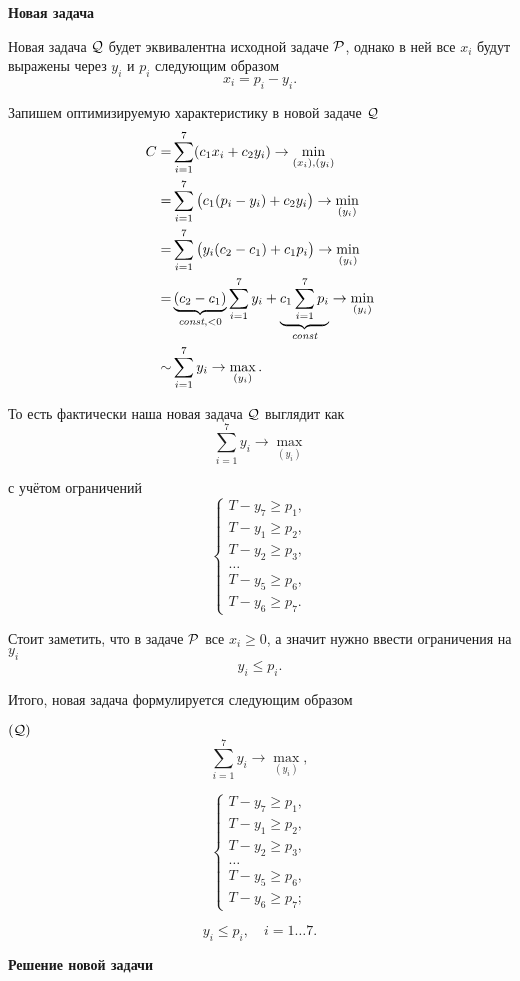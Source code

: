\bigskip

\textbf{Новая задача}

Новая задача $\Q$ будет эквивалентна исходной задаче $\P$, однако в ней все $x_i$ будут выражены через $y_i$ и $p_i$ следующим образом
\[
x_i = p_i - y_i.
\]

Запишем оптимизируемую характеристику в новой задаче $\Q$
\begin{align*}
	C =& \sum_{i=1}^7 (c_1 x_i + c_2 y_i) \to \min_{(x_i), (y_i)} \\
	=& \sum_{i=1}^7 \big(c_1 (p_i - y_i) + c_2 y_i\big) \to \min_{(y_i)} \\
	=&  \sum_{i=1}^7 \big(y_i (c_2 - c_1) + c_1 p_i\big) \to \min_{(y_i)} \\
	=& \underbrace{(c_2 - c_1)}_{\const, <0} \sum_{i=1}^7 y_i + \underbrace{c_1 \sum_{i=1}^{7} p_i}_{\const} \to \min_{(y_i)} \\
	\sim& \sum_{i=1}^7 y_i \to \max_{(y_i)}.
\end{align*}

То есть фактически наша новая задача $\Q$ выглядит как
\[
\sum_{i=1}^7 y_i \to \max_{(y_i)}
\]

с учётом ограничений
\[
\begin{cases}
	T - y_7 \ge p_1, \\
	T - y_1 \ge p_2, \\
	T - y_2 \ge p_3, \\
	\dots \\
	T - y_5 \ge p_6, \\
	T - y_6 \ge p_7.
\end{cases}
\]

Стоит заметить, что в задаче $\P$ все $x_i \ge 0$, а значит нужно ввести ограничения на $y_i$
\[
	y_i \le p_i.
\]

Итого, новая задача формулируется следующим образом

$(\Q)$ 
\[
\sum_{i=1}^7 y_i \to \max_{(y_i)},
\]

\[
\begin{cases}
	T - y_7 \ge p_1, \\
	T - y_1 \ge p_2, \\
	T - y_2 \ge p_3, \\
	\dots \\
	T - y_5 \ge p_6, \\
	T - y_6 \ge p_7;
\end{cases}
\]

\[
y_i \le p_i, \quad i = 1 \dots 7.
\]

\textbf{Решение новой задачи}

